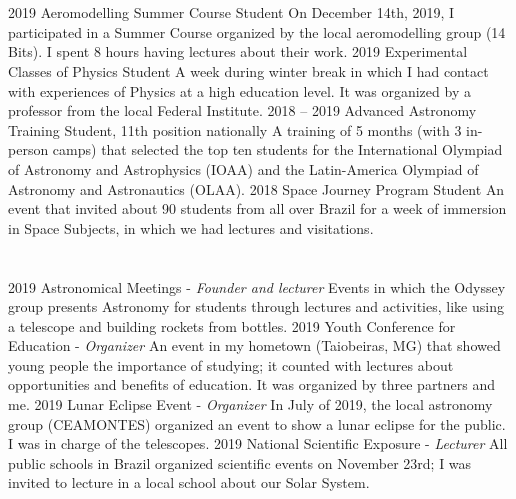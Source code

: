 \documentclass{cv}
\begin{document}
    \section*{}
        \begin{entrylist}
            \entry
                {2019}
                {Aeromodelling Summer Course}
                {Student}
                {On December 14th, 2019, I participated in a Summer Course organized by the local aeromodelling group (14 Bits). I spent 8 hours having lectures about their work.}
            \entry
                {2019}
                {Experimental Classes of Physics}
                {Student}
                {A week during winter break in which I had contact with experiences of Physics at a high education level. It was organized by a professor from the local Federal Institute.}
            \entry
                {2018 -- 2019}
                {Advanced Astronomy Training}
                {Student, 11th position nationally}
                {A training of 5 months (with 3 in-person camps) that selected the top ten students for the International Olympiad of Astronomy and Astrophysics (IOAA) and the Latin-America Olympiad of Astronomy and Astronautics (OLAA).}
            \entry
                {2018}
                {Space Journey Program}
                {Student}
                {An event that invited about 90 students from all over Brazil for a week of immersion in Space Subjects, in which we had lectures and visitations.}
        \end{entrylist}
    
    \section*{}
        \begin{entrylist}
            \entry
                {2019}
                {Astronomical Meetings - {\textit{Founder and lecturer}}}
                {}
                {Events in which the Odyssey group presents Astronomy for students through lectures and activities, like using a telescope and building rockets from bottles.}
            \entry
                {2019}
                {Youth Conference for Education - {\textit{Organizer}}}
                {}
                {An event in my hometown (Taiobeiras, MG) that showed young people the importance of studying; it counted with lectures about opportunities and benefits of education. It was organized by three partners and me.}
            \entry
                {2019}
                {Lunar Eclipse Event - {\textit{Organizer}}}
                {}
                {In July of 2019, the local astronomy group (CEAMONTES) organized an event to show a lunar eclipse for the public. I was in charge of the telescopes.}
            \entry
                {2019}
                {National Scientific Exposure - {\textit{Lecturer}}}
                {}
                {All public schools in Brazil organized scientific events on November 23rd; I was invited to lecture in a local school about our Solar System.}
        \end{entrylist}
\end{document}
